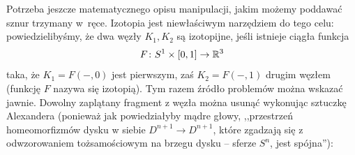 Potrzeba jeszcze matematycznego opisu manipulacji, jakim możemy poddawać sznur trzymany w~ręce.
Izotopia jest niewłaściwym narzędziem do tego celu: powiedzielibyśmy, że dwa węzły $K_1, K_2$ są izotopijne, jeśli istnieje ciągła funkcja
\begin{equation}
    F \colon S^1 \times [0, 1] \to \mathbb R^3
\end{equation}
taka, że $K_1 = F(-, 0)$ jest pierwszym, zaś $K_2 = F(-,1)$ drugim węzłem (funkcję $F$ nazywa się izotopią).
Tym razem źródło problemów można wskazać jawnie.
Dowolny zaplątany fragment z węzła można usunąć wykonując sztuczkę Alexandera (ponieważ jak powiedziałyby mądre głowy, ,,przestrzeń homeomorfizmów dysku w siebie $D^{n+1} \to D^{n+1}$, które zgadzają się z odwzorowaniem tożsamościowym na brzegu dysku -- sferze $S^n$, jest spójna''):
%
%

